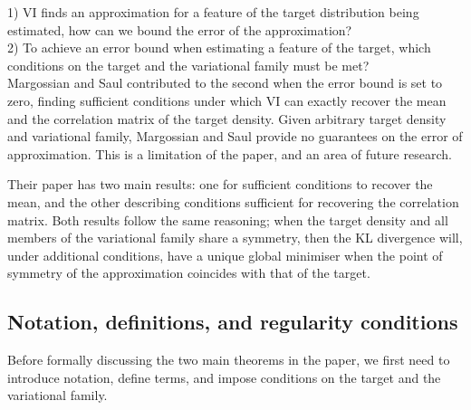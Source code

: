 \documentclass{article}
\begin{document}
1) VI finds an approximation for a feature of the target distribution being estimated, how can we bound the error of the approximation? \\
2) To achieve an error bound when estimating a feature of the target, which conditions on the target and the variational family must be met? \\

Margossian and Saul contributed to the second when the error bound is set to zero, finding sufficient conditions under which VI can exactly recover the mean and the correlation matrix of the target density.
Given arbitrary target density and variational family, Margossian and Saul provide no guarantees on the error of approximation.
This is a limitation of the paper, and an area of future research.


Their paper has two main results: one for sufficient conditions to recover the mean, and the other describing conditions sufficient for recovering the correlation matrix.
Both results follow the same reasoning; when the target density and all members of the variational family share a symmetry,
then the KL divergence will, under additional conditions, have a unique global minimiser when the point of symmetry of the approximation coincides with that of the target.

\subsection{Notation, definitions, and regularity conditions}

Before formally discussing the two main theorems in the paper, we first need to introduce notation, define terms, and impose conditions on the target and the variational family.
\end{document}
